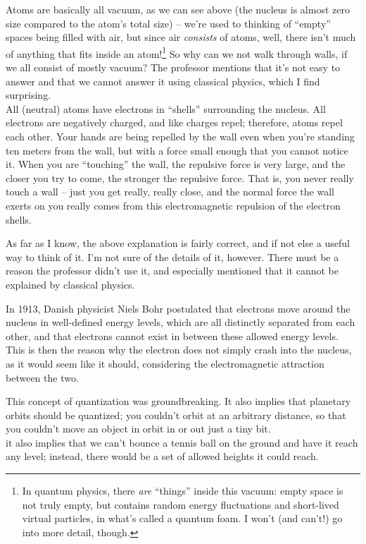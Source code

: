 Atoms are basically all vacuum, as we can see above (the nucleus is almost zero size compared to the atom's total size) -- we're used to thinking of ``empty'' spaces being filled with air, but since air \emph{consists} of atoms, well, there isn't much of anything that fits inside an atom!\footnote{In quantum physics, there \emph{are} ``things'' inside this vacuum: empty space is not truly empty, but contains random energy fluctuations and short-lived virtual particles, in what's called a quantum foam. I won't (and can't!) go into more detail, though.}
So why can we not walk through walls, if we all consist of mostly vacuum? The professor mentions that it's not easy to answer and that we cannot answer it using classical physics, which I find surprising.\\
All (neutral) atoms have electrons in ``shells'' surrounding the nucleus. All electrons are negatively charged, and like charges repel; therefore, atoms repel each other. Your hands are being repelled by the wall even when you're standing ten meters from the wall, but with a force small enough that you cannot notice it. When you are ``touching'' the wall, the repulsive force is very large, and the closer you try to come, the stronger the repulsive force. That is, you never really touch a wall -- just you get really, really close, and the normal force the wall exerts on you really comes from this electromagnetic repulsion of the electron shells.

As far as I know, the above explanation is fairly correct, and if not else a useful way to think of it. I'm not sure of the details of it, however. There must be a reason the professor didn't use it, and especially mentioned that it cannot be explained by classical physics.

In 1913, Danish physicist Niels Bohr postulated that electrons move around the nucleus in well-defined energy levels, which are all distinctly separated from each other, and that electrons cannot exist in between these allowed energy levels. This is then the reason why the electron does not simply crash into the nucleus, as it would seem like it should, considering the electromagnetic attraction between the two.

This concept of quantization was groundbreaking. It also implies that planetary orbits should be quantized; you couldn't orbit at an arbitrary distance, so that you couldn't move an object in orbit in or out just a tiny bit.\\
it also implies that we can't bounce a tennis ball on the ground and have it reach any level; instead, there would be a set of allowed heights it could reach.

